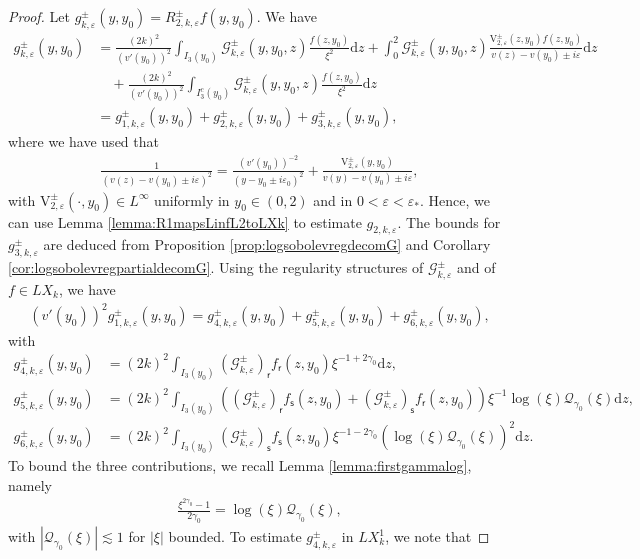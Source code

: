 \documentclass[11pt,reqno]{amsproc}
\theoremstyle{definition}
\numberwithin{equation}{section}
\newcommand{\G}{{\mathcal{G}}}
\newcommand{\Q}{{\mathcal{Q}}}
\newcommand{\sr}{{\mathsf{r}}}
\newcommand{\s}{{\mathsf{s}}}
\renewcommand{\d}{\mathrm{d}}
\newcommand{\ep}{\varepsilon}
\begin{document}
\begin{proof}
Let $g_{k,\ep}^\pm(y,y_0) = R_{2,k,\ep}^\pm f(y,y_0)$. We have
\begin{align*}
g_{k,\ep}^\pm(y,y_0) &= \frac{(2k)^2}{(v'(y_0))^2}\int_{I_3(y_0)} \G_{k,\ep}^\pm(y,y_0,z) \frac{f(z,y_0)}{\xi^2} \d z + \int_0^2 \G_{k,\ep}^\pm (y,y_0,z) \frac{\mathrm{V}_{2,\ep}^\pm(z,y_0) f(z,y_0)}{v(z) - v(y_0) \pm i\ep} \d z \\
&\quad + \frac{(2k)^2}{(v'(y_0))^2}\int_{I_3^c(y_0)} \G_{k,\ep}^\pm(y,y_0,z) \frac{f(z,y_0)}{\xi^2} \d z \\
&= g_{1,k,\ep}^\pm(y,y_0) + g_{2,k,\ep}^\pm(y,y_0) + g_{3,k,\ep}^\pm(y,y_0),
\end{align*}
where we have used that
\begin{align*}
\frac{1}{(v(z) - v(y_0) \pm i\ep)^2} = \frac{(v'(y_0))^{-2}}{(y-y_0 \pm i\ep_0)^2} + \frac{\mathrm{V}_{2,\ep}^\pm(y,y_0)}{v(y) - v(y_0) \pm i\ep},
\end{align*}
with $\mathrm{V}_{2,\ep}^\pm (\cdot,y_0)\in L^\infty$ uniformly in $y_0\in (0,2)$ and in $0<\ep<\ep_*$. Hence, we can use Lemma \ref{lemma:R1mapsLinfL2toLXk} to estimate $g_{2,k,\ep}$. The bounds for $g_{3,k,\ep}^\pm$ are deduced from Proposition \ref{prop:logsobolevregdecomG} and Corollary \ref{cor:logsobolevregpartialdecomG}. Using the regularity structures of $\G_{k,\ep}^\pm$ and of $f\in LX_k$, we have
\begin{align*}
(v'(y_0))^2 g_{1,k,\ep}^\pm(y,y_0) = g_{4,k,\ep}^\pm(y,y_0) + g_{5,k,\ep}^\pm(y,y_0) + g_{6,k,\ep}^\pm(y,y_0),
\end{align*}
with
\begin{align*}
g_{4,k,\ep}^\pm(y,y_0) &= (2k)^2\int_{I_3(y_0)} \left( \G_{k,\ep}^\pm \right)_\sr f_\sr(z,y_0) \xi^{-1+2\gamma_0}\d z, \\
g_{5,k,\ep}^\pm(y,y_0) &= (2k)^2\int_{I_3(y_0)} \left(  \left( \G_{k,\ep}^\pm \right)_\sr f_\s(z,y_0) + \left( \G_{k,\ep}^\pm \right)_\s f_\sr(z,y_0) \right) \xi^{-1}\log(\xi)\Q_{\gamma_0}(\xi)\d z, \\
g_{6,k,\ep}^\pm(y,y_0) &= (2k)^2\int_{I_3(y_0)} \left( \G_{k,\ep}^\pm \right)_\s f_\s(z,y_0) \xi^{-1-2\gamma_0}\left( \log(\xi) \Q_{\gamma_0}(\xi) \right)^2 \d z.
\end{align*}
To bound the three contributions, we recall Lemma \ref{lemma:firstgammalog}, namely 
\begin{align*}
\frac{\xi^{2\gamma_0}-1}{2\gamma_0} = \log(\xi) \Q_{\gamma_0}(\xi),
\end{align*}
with $|\Q_{\gamma_0}(\xi)|\lesssim 1$ for $|\xi|$ bounded. To estimate $g_{4,k,\ep}^\pm$ in $LX_k^1$, we note that

\end{proof}
\end{document}
